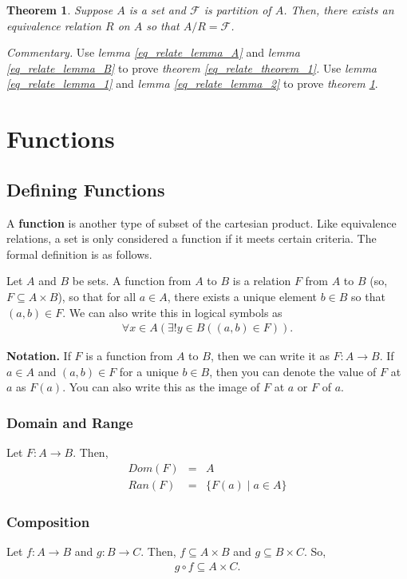 \documentclass{article}
\newtheorem{theorem}{Theorem}[section]
\begin{document}
\begin{theorem} \label{eq_relate_theorem_2}
    Suppose $A$ is a set and $\mathcal{F}$ is partition of $A$. Then, there exists an equivalence relation $R$ on $A$ so that $A / R = \mathcal{F}$.
\end{theorem}

\noindent \textit{Commentary.} Use \textit{lemma \ref{eq_relate_lemma_A}} and \textit{lemma \ref{eq_relate_lemma_B}} to prove 
\textit{theorem \ref{eq_relate_theorem_1}.} Use \textit{lemma \ref{eq_relate_lemma_1}} and \textit{lemma \ref{eq_relate_lemma_2}} to prove 
\textit{theorem \ref{eq_relate_theorem_2}}.

\section{Functions}
\subsection{Defining Functions}
A \textbf{function} is another type of subset of the cartesian product. Like equivalence relations, a set is only considered a function if it meets 
certain criteria. The formal definition is as follows.

\noindent Let $A$ and $B$ be sets. A function from $A$ to $B$ is a relation $F$ from $A$ to $B$ (so, $F \subseteq A \times B$), so that for all
$a \in A$, there exists a unique element $b \in B$ so that $(a,b) \in F$. We can also write this in logical symbols as
\begin{eqnarray*}
    \forall x \in A ( \exists ! y \in B((a,b) \in F)).
\end{eqnarray*}

\noindent \textbf{Notation.} If $F$ is a function from $A$ to $B$, then we can write it as $F: A \rightarrow B$. If $a \in A$ and $(a,b) \in F$ for a unique
$b \in B$, then you can denote the value of $F$ at $a$ as $F(a)$. You can also write this as the image of $F$ at $a$ or $F$ of $a$.

\subsubsection{Domain and Range}
Let $F: A \rightarrow B$. Then,
\begin{eqnarray*}
    Dom(F) &=& A \\
    Ran(F) &=& \{ F(a) \; | \; a \in A \}
\end{eqnarray*}

\subsubsection{Composition}
Let $f : A \rightarrow B$ and $g: B \rightarrow C$. Then, $f \subseteq A \times B$ and $g \subseteq B \times C$. So,
\begin{eqnarray*}
    g \circ f \subseteq A \times C.
\end{eqnarray*}
\end{document}

